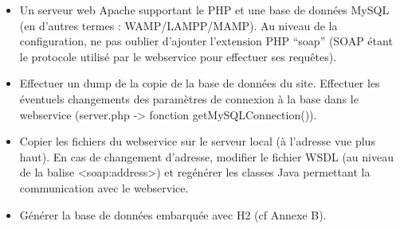 \begin{itemize}
\item Un serveur web Apache supportant le PHP et une base de données MySQL (en d'autres termes : WAMP/LAMPP/MAMP). Au niveau de la configuration, ne pas oublier d'ajouter l'extension PHP ``soap'' (SOAP étant le protocole utilisé par le webservice pour effectuer ses requêtes).
\item Effectuer un dump de la copie de la base de données du site. Effectuer les éventuels changements des paramètres de connexion à la base dans le webservice (server.php -> fonction getMySQLConnection()).
\item Copier les fichiers du webservice sur le serveur local (à l'adresse vue plus haut). En cas de changement d'adresse, modifier le fichier WSDL (au niveau de la balise <soap:address>) et regénérer les classes Java permettant la communication avec le webservice.
\item Générer la base de données embarquée avec H2 (cf Annexe B).
\end{itemize}